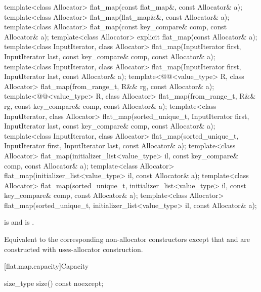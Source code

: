 %
\begin{itemdecl}
template<class Allocator>
  flat_map(const flat_map&, const Allocator& a);
template<class Allocator>
  flat_map(flat_map&&, const Allocator& a);
template<class Allocator>
  flat_map(const key_compare& comp, const Allocator& a);
template<class Allocator>
  explicit flat_map(const Allocator& a);
template<class InputIterator, class Allocator>
  flat_map(InputIterator first, InputIterator last, const key_compare& comp, const Allocator& a);
template<class InputIterator, class Allocator>
  flat_map(InputIterator first, InputIterator last, const Allocator& a);
template<@@<value_type> R, class Allocator>
  flat_map(from_range_t, R&& rg, const Allocator& a);
template<@@<value_type> R, class Allocator>
  flat_map(from_range_t, R&& rg, const key_compare& comp, const Allocator& a);
template<class InputIterator, class Allocator>
  flat_map(sorted_unique_t, InputIterator first, InputIterator last,
           const key_compare& comp, const Allocator& a);
template<class InputIterator, class Allocator>
  flat_map(sorted_unique_t, InputIterator first, InputIterator last, const Allocator& a);
template<class Allocator>
  flat_map(initializer_list<value_type> il, const key_compare& comp, const Allocator& a);
template<class Allocator>
  flat_map(initializer_list<value_type> il, const Allocator& a);
template<class Allocator>
  flat_map(sorted_unique_t, initializer_list<value_type> il,
           const key_compare& comp, const Allocator& a);
template<class Allocator>
  flat_map(sorted_unique_t, initializer_list<value_type> il, const Allocator& a);
\end{itemdecl}

\begin{itemdescr}
\pnum
\constraints
{} is  and
 is .

\pnum
\effects
Equivalent to the corresponding non-allocator constructors
except that  and  are constructed
with uses-allocator construction.
\end{itemdescr}

[flat.map.capacity]{Capacity}

%
\begin{itemdecl}
size_type size() const noexcept;
\end{itemdecl}

